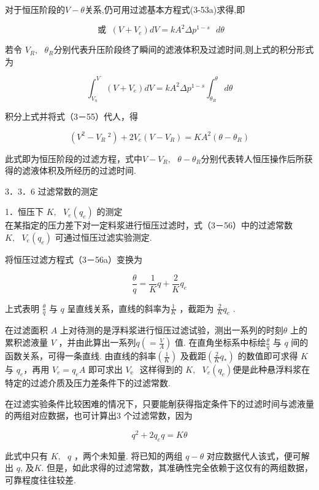 \documentclass[
]{article}
\begin{document}
对于恒压阶段的\(V - \theta\)关系,仍可用过滤基本方程式(3-53a)求得,即

\[\text{~或~}\ \left( V + V_{e} \right)dV = kA^{2}\Delta p^{1 - s}\text{\ }d\theta\]

若令 \(V_{R},\text{\ }\theta_{R}\)分别代表升压阶段终了瞬间的滤液体积及过滤时间,则上式的积分形式为

\[\int_{V_{n}}^{V}\mspace{2mu}\left( V + V_{e} \right)dV = kA^{2}\Delta p^{1 - s}\int_{\theta_{R}}^{\theta}\mspace{2mu} d\theta\]

积分上式并将式（3－55）代人，得

\[\left( V^{2} - V_{R}\ ^{2} \right) + 2V_{e}\left( V - V_{R} \right) = KA^{2}\left( \theta - \theta_{R} \right)\]

此式即为恒压阶段的过滤方程，式中\(V - V_{R},\text{\ }\theta - \theta_{R}\)分别代表转人恒压操作后所获得的滤液体积及所经历的过滤时间. 

3．3．6 过滤常数的测定

1．恒压下 \(K,\text{\ }V_{e}\left( q_{e} \right)\) 的测定\\在某指定的压力差下对一定料浆进行恒压过滤时，式（3－56）中的过滤常数\(K,\text{\ }V_{e}\left( q_{e} \right)\) 可通过恒压过滤实验测定. 

将恒压过滤方程式（3－56a）变换为

\[\frac{\theta}{q} = \frac{1}{K}q + \frac{2}{K}q_{e}\]

上式表明 \(\frac{\theta}{q}\) 与 \(q\) 呈直线关系，直线的斜率为\(\frac{1}{K}\) ，截距为 \(\frac{2}{K}q_{e}\) .

在过滤面积 \(A\) 上对待测的是浮料浆进行恒压过滤试验，测出一系列的时刻\(\theta\) 上的累积滤液量 \(V\) ，并由此算出一系列\(q\left( = \frac{V}{A} \right)\) 值. 在直角坐标系中标绘\(\frac{\theta}{q}\) 与 \(q\) 间的函数关系，可得一条直线. 由直线的斜率\(\left( \frac{1}{K} \right)\) 及截距\(\left( \frac{2}{K}q_{*} \right)\) 的数值即可求得 \(K\) 与 \(q_{e}\)，再用 \(V_{e} = q_{e}A\) 即可求出 \(V_{\text{e}\text{~}\text{\ }}\)这样得到的 \(K,\text{\ }V_{e}\left( q_{e} \right)\)便是此种悬浮料浆在特定的过滤介质及压力差条件下的过滤常数. 

在过滤实验条件比较困难的情况下，只要能㓩获得指定条件下的过滤时间与滤液量的两组对应数据，也可计算出3 个过滤常数，因为

\[q^{2} + 2q_{e}q = K\theta\]

此式中只有 \(K,\text{\ }q\) ，两个未知量. 将已知的两组 \(q - \theta\)
对应数据代人该式，便可解出 \(q\), 及\(K\). 但是，如此求得的过滤常数，其准确性完全依赖于这仅有的两组数据，可靠程度往往较差. 
\end{document}
